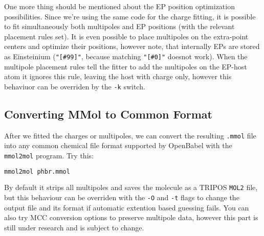 \documentclass[10pt,a4paper]{article}
\begin{document}
One more thing should be mentioned about the EP position optimization possibilities. Since
we're using the same code for the charge fitting, it is possible to fit simultaneously both
multipoles and EP positions (with the relevant placement rules set). It is even possible 
to place multipoles on the extra-point centers and optimize their positions, however note, 
that internally EPs are stored as Einsteinium (\lstinline{"[#99]"}, because matching 
\lstinline{"[#0]"} doesnot work). When the multipole placement rules tell the fitter to 
add the multipoles on the EP-host atom 
it ignores this rule, leaving the host with charge only, however this behaviuor can be 
overriden by the \lstinline{-k} switch.

\subsection{Converting MMol to Common Format}
After we fitted the charges or multipoles, we can convert the resulting \lstinline{.mmol} 
file into any common chemical file format supported by OpenBabel with the
\lstinline{mmol2mol} program. Try this:
\begin{lstlisting}[language=bash]
mmol2mol phbr.mmol
\end{lstlisting}
By default it strips all multipoles and saves the molecule as a TRIPOS \lstinline{MOL2} 
file, but this behaviour can be overriden with the \lstinline{-O} and \lstinline{-t} flags 
to change the output file and its format if automatic extention based guessing fails. 
You can also try MCC conversion
options to preserve multipole data, however this part is still under research and is
subject to change.
\end{document}
